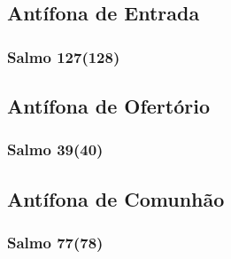 \subsection{Antífona de Entrada}


\subsubsection{Salmo 127(128)}


\subsection{Antífona de Ofertório}


\subsubsection{Salmo 39(40)}


\subsection{Antífona de Comunhão}


\subsubsection{Salmo 77(78)}

